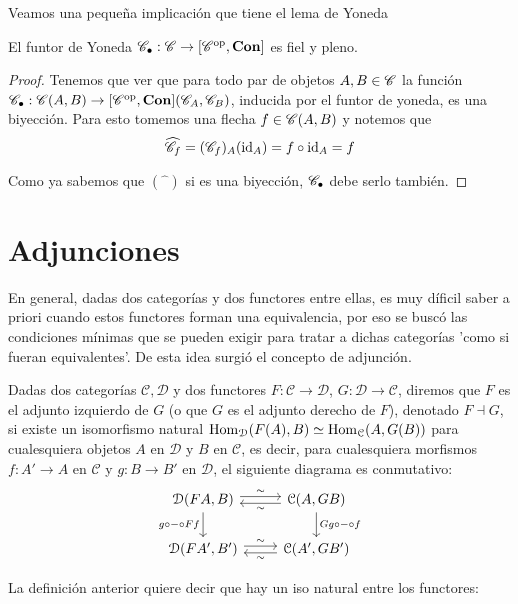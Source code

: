 \documentclass{comunicaciones}
\begin{document}
Veamos una pequeña implicación que tiene el lema de Yoneda

\begin{cor}
    El funtor de Yoneda $\mathscr C_\bullet:\mathscr C\to[\mathscr C^{\mathrm{op}},\mathbf{Con}]$ es fiel y pleno.
\end{cor}

\begin{proof}
    Tenemos que ver que para todo par de objetos $A,B\in\mathscr C$ la función $\mathscr C_\bullet:\mathscr C(A,B)\to[\mathscr C^{\mathrm{op}},\mathbf{Con}](\mathscr C_A,\mathscr C_B)$, inducida por el funtor de yoneda,
    es una biyección. Para esto tomemos una flecha $f\in\mathscr C(A,B)$ y notemos que
    \[ \widehat{\mathscr C_f}=(\mathscr C_f)_A(\mathrm{id}_A)=f\circ\mathrm{id}_A=f \]
    
    Como ya sabemos que $(\widehat{\phantom{a}})$ si es una biyección, $\mathscr C_\bullet$ debe serlo también.
\end{proof}

\section{Adjunciones}

	En general, dadas dos categorías y dos functores entre ellas, es muy díficil saber a priori cuando estos functores forman una equivalencia, por eso se buscó las condiciones mínimas que se pueden exigir para tratar a dichas categorías 'como si fueran equivalentes'. De esta idea surgió el concepto de adjunción.
\begin{dfn}
	Dadas dos categorías $\mathcal{C,D}$ y dos functores $F:\mathcal{C\to D}$, $G:\mathcal{D\to C}$, diremos que $F$ es el adjunto izquierdo de $G$ (o que $G$ es el adjunto derecho de $F$), denotado $F\dashv G$, si existe un isomorfismo natural $\mathrm{Hom}_\mathcal{D}(F(A),B)\simeq \mathrm{Hom}_\mathcal{C}(A,G(B))$ para cualesquiera objetos $A$ en $\mathcal{D}$ y $B$ en $\mathcal{C}$, es decir, para cualesquiera morfismos $f:A'\to A$
	en $\mathcal{C}$ y $g:B\to B'$ en $\mathcal{D}$,
	el siguiente diagrama es conmutativo:
	\[
	\begin{tikzcd}
		\mathcal{D}(FA,B)
		\ar[d,"g\circ-\circ Ff"']
		\ar[r,"\sim",shift left]
		& \mathcal{C}(A,GB) 
		\ar[d,"Gg\circ-\circ f"]
		\ar[l,"\sim",shift left] \\
		\mathcal{D}(FA',B')
		\ar[r,"\sim",shift left]
		& \mathcal{C}(A',GB')
		\ar[l,"\sim",shift left]
	\end{tikzcd}
	\]
\end{dfn}
La definición anterior quiere decir que hay un iso natural entre los functores:
\end{document}
